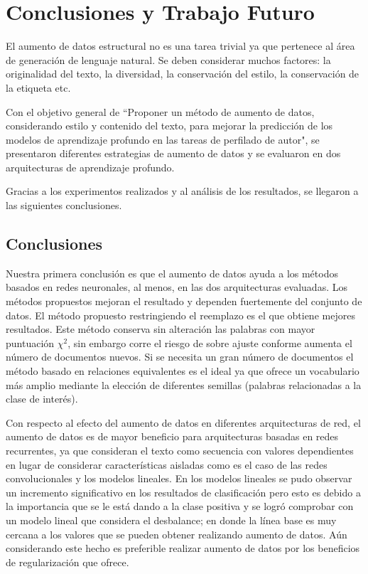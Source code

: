 
\chapter{Conclusiones y Trabajo Futuro}
El aumento de datos estructural no es una tarea trivial ya que pertenece al área de generación de lenguaje natural. Se deben considerar muchos factores: la originalidad del texto, la diversidad, la conservación del estilo, la conservación de la etiqueta etc. 

Con el objetivo general de ``Proponer  un  método  de  aumento  de  datos,  considerando  estilo  y  contenido  del texto, para mejorar la predicción de los modelos de aprendizaje profundo en las tareas de perfilado de autor", se presentaron diferentes estrategias de aumento de datos y se evaluaron en dos arquitecturas de aprendizaje profundo. 

Gracias a los experimentos realizados y al análisis de los resultados, se llegaron a las siguientes conclusiones.

\section{Conclusiones}

Nuestra primera conclusión es que el aumento de datos ayuda a los métodos basados en redes neuronales, al menos, en las dos arquitecturas evaluadas. Los métodos propuestos mejoran el resultado y dependen fuertemente del conjunto de datos.    
  El método propuesto restringiendo el reemplazo es el que  obtiene mejores resultados. Este método conserva sin alteración las palabras con mayor puntuación $\chi^2$, sin embargo corre el riesgo de sobre ajuste conforme aumenta el número de documentos nuevos. Si se necesita un gran número de documentos el método basado en relaciones equivalentes es el ideal ya que ofrece un vocabulario más amplio mediante la elección de diferentes semillas (palabras relacionadas a la clase de interés). 

Con respecto al efecto del aumento de datos en diferentes arquitecturas de red, el aumento de datos es de mayor beneficio para arquitecturas basadas en redes recurrentes, ya que consideran el texto como secuencia con valores dependientes en lugar de considerar características aisladas como es el caso de las redes convolucionales y los modelos lineales. En los modelos lineales se pudo observar un incremento significativo en los resultados de clasificación pero esto es debido a la importancia que se le está dando a la clase positiva y se logró comprobar con un modelo lineal que considera el desbalance; en donde la línea base es muy cercana a los valores que se pueden obtener realizando aumento de datos. Aún considerando este hecho es preferible realizar aumento de datos por los beneficios de regularización que ofrece.

